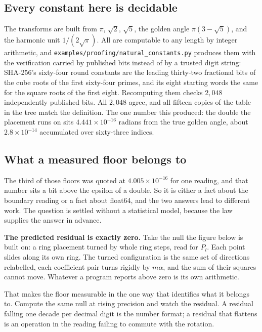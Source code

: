\subsection{Every constant here is decidable}

The transforms are built from \(\pi\), \(\sqrt2\), \(\sqrt5\), the golden angle \(\pi(3-\sqrt5)\), and the harmonic unit \(1/(2\sqrt\pi)\). All are computable to any length by integer arithmetic, and \texttt{examples/proofing/natural\_constants.py} produces them with the verification carried by published bits instead of by a trusted digit string: SHA-256's sixty-four round constants are the leading thirty-two fractional bits of the cube roots of the first sixty-four primes, and its eight starting words the same for the square roots of the first eight. Recomputing them checks \(2{,}048\) independently published bits. All \(2{,}048\) agree, and all fifteen copies of the table in the tree match the definition. The one number this produced: the double the placement runs on sits \(4.441 \times 10^{-16}\) radians from the true golden angle, about \(2.8 \times 10^{-14}\) accumulated over sixty-three indices.

\subsection{What a measured floor belongs to}
\label{sec:precisionfloor}

The third of those floors was quoted at \(4.005 \times 10^{-16}\) for one reading, and that number sits a bit above the epsilon of a double. So it is either a fact about the boundary reading or a fact about float64, and the two answers lead to different work. The question is settled without a statistical model, because the law supplies the answer in advance.

\textbf{The predicted residual is exactly zero.} Take the null the figure below is built on: a ring placement turned by whole ring steps, read for \(P_l\). Each point slides along its own ring. The turned configuration is the same set of directions relabelled, each coefficient pair turns rigidly by \(m\alpha\), and the sum of their squares cannot move. Whatever a program reports above zero is its own arithmetic.

That makes the floor measurable in the one way that identifies what it belongs to. Compute the same null at rising precision and watch the residual. A residual falling one decade per decimal digit is the number format; a residual that flattens is an operation in the reading failing to commute with the rotation.

